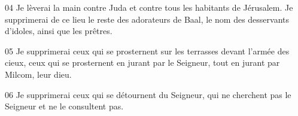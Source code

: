 
04 Je lèverai la main contre Juda et contre tous les habitants de Jérusalem. Je supprimerai de ce lieu le reste des adorateurs de Baal, le nom des desservants d’idoles, ainsi que les prêtres.

05 Je supprimerai ceux qui se prosternent sur les terrasses devant l’armée des cieux, ceux qui se prosternent en jurant par le Seigneur, tout en jurant par Milcom, leur dieu.

06 Je supprimerai ceux qui se détournent du Seigneur, qui ne cherchent pas le Seigneur et ne le consultent pas.
